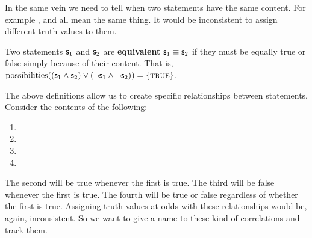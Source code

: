 \documentclass[11pt,letterpaper,fleqn]{memoir} %
\begin{document}
In the same vein we need to tell when two statements have the same content. For example ,  and  all mean the same thing. It would be inconsistent to assign different truth values to them.

\begin{mathSection}

\begin{defn}
	Two statements $\mathsf{s}_1$ and $\mathsf{s}_2$ are \textbf{equivalent} $\mathsf{s}_1 \equiv \mathsf{s}_2$ if they must be equally true or false simply because of their content. That is, $\operatorname{possibilities}((\mathsf{s}_1 \wedge \mathsf{s}_2) \vee (\neg\mathsf{s}_1 \wedge \neg\mathsf{s}_2) )= \{\textsc{true}\}$.
\end{defn}

\end{mathSection}

The above definitions allow us to create specific relationships between statements. Consider the contents of the following:
\begin{enumerate}
	\item {}
	\item {}
	\item {}
	\item {}
\end{enumerate}
The second will be true whenever the first is true. The third will be false whenever the first is true. The fourth will be true or false regardless of whether the first is true. Assigning truth values at odds with these relationships would be, again, inconsistent. So we want to give a name to these kind of correlations and track them.
\end{document}
